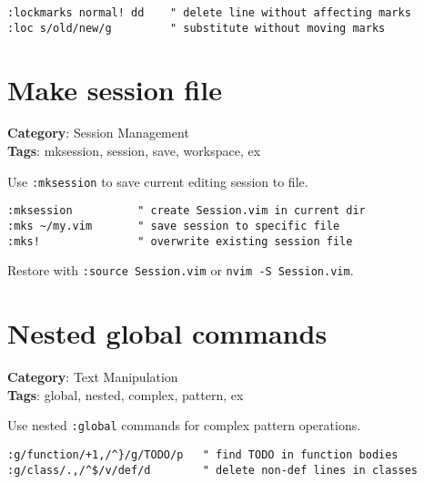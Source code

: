 {{{{{\begin{Exa*}{}
\begin{Verbatim}[fontsize=\footnotesize, breaklines, breakanywhere]
:lockmarks normal! dd    " delete line without affecting marks
:loc s/old/new/g         " substitute without moving marks
\end{Verbatim}
\end{Exa*}

\section{Make session file}

\textbf{Category}: Session Management\\ \textbf{Tags}: mksession, session, save, workspace, ex
\vspace{0.5cm}

Use {\footnotesize \Verb§:mksession§} to save current editing session to file.

\begin{Exa*}{}
\begin{Verbatim}[fontsize=\footnotesize, breaklines, breakanywhere]
:mksession          " create Session.vim in current dir
:mks ~/my.vim       " save session to specific file
:mks!               " overwrite existing session file
\end{Verbatim}
\end{Exa*}

Restore with {\footnotesize \Verb§:source Session.vim§} or {\footnotesize \Verb§nvim -S Session.vim§}.

\section{Nested global commands}

\textbf{Category}: Text Manipulation\\ \textbf{Tags}: global, nested, complex, pattern, ex
\vspace{0.5cm}

Use nested {\footnotesize \Verb§:global§} commands for complex pattern operations.

\begin{Exa*}{}
\begin{Verbatim}[fontsize=\footnotesize, breaklines, breakanywhere]
:g/function/+1,/^}/g/TODO/p   " find TODO in function bodies
:g/class/.,/^$/v/def/d        " delete non-def lines in classes
\end{Verbatim}
\end{Exa*}

}}}}}
